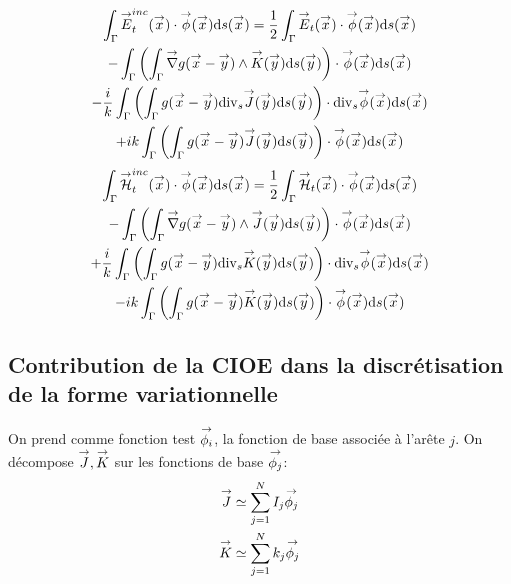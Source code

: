     \begin{multline}
      \label{eq:form_int:EFIE:var}
      \int_\Gamma \vE^{inc}_t(\vx) \cdot \vect{\phi}(\vx) \dd{s}(\vx) =
        \frac{1}{2} \int_\Gamma \vE_t(\vx) \cdot \vect{\phi}(\vx) \dd{s}(\vx) \\
          - \int_\Gamma \left( \int_\Gamma \vgrad g(\vx - \vy) \pvect \vK(\vy) \dd{s}(\vy) \right) \cdot \vect{\phi}(\vx) \dd{s}(\vx) \\
        - \frac{i}{k} \int_\Gamma \left( \int_\Gamma  g(\vx - \vy)\tdivs\vJ(\vy) \dd{s}(\vy) \right) \cdot \tdivs \vect{\phi}(\vx) \dd{s}(\vx) \\
          +  ik\int_\Gamma \left( \int_\Gamma g(\vx - \vy)\vJ(\vy) \dd{s}(\vy) \right) \cdot \vect{\phi}(\vx) \dd{s}(\vx)
    \end{multline}
    \begin{multline}
      \label{eq:form_int:MFIE:var}
      \int_\Gamma \vH^{inc}_t(\vx) \cdot \vect{\phi}(\vx) \dd{s}(\vx) =
        \frac{1}{2} \int_\Gamma \vH_t(\vx) \cdot \vect{\phi}(\vx) \dd{s}(\vx) \\
          - \int_\Gamma \left( \int_\Gamma \vgrad g(\vx - \vy) \pvect \vJ(\vy) \dd{s}(\vy) \right) \cdot \vect{\phi}(\vx) \dd{s}(\vx) \\
        + \frac{i}{k} \int_\Gamma \left( \int_\Gamma  g(\vx - \vy)\tdivs\vK(\vy) \dd{s}(\vy) \right) \cdot \tdivs \vect{\phi}(\vx) \dd{s}(\vx) \\
          -  ik\int_\Gamma \left( \int_\Gamma g(\vx - \vy)\vK(\vy) \dd{s}(\vy) \right) \cdot \vect{\phi}(\vx) \dd{s}(\vx)
    \end{multline}


  \subsection{Contribution de la CIOE dans la discrétisation de la forme variationnelle}

    \newcommand{\phii}{\vect{\phi_i}}
    \newcommand{\pii}{\vect{p_i}}
    \newcommand{\phip}{\vect{\phi_p}}
    \newcommand{\phiq}{\vect{\phi_q}}

    On prend comme fonction test \(\phii\), la fonction de base associée à l'arête \(j\).
    On décompose \({\overset{\rightarrow}{J}},{\overset{\rightarrow}{K}}\) sur les fonctions de base \({\overset{\rightarrow}{\phi_j}}\):
    \begin{subequations}
      \begin{align}
        {\overset{\rightarrow}{J}} &\simeq \sum_{j=1}^N I_j {\overset{\rightarrow}{\phi_j}}\\
        {\overset{\rightarrow}{K}} &\simeq \sum_{j=1}^N k_j {\overset{\rightarrow}{\phi_j}}
      \end{align}
    \end{subequations}

